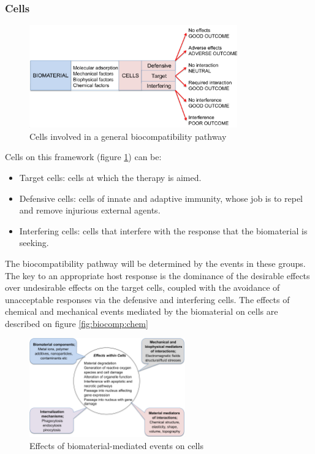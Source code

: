 		\subsubsection{Cells}

		\begin{figure}[ht]
			\includegraphics[width=0.8\textwidth]{biocomp_cells.png}
			\caption{Cells involved in a general biocompatibility pathway}
			\label{fig:biocomp_cells}
		\end{figure}

		Cells on this framework (figure \ref{fig:biocomp_cells}) can be:

		\begin{multicols}{2}
			\begin{itemize}
				\item Target cells: cells at which the therapy is aimed.
				\item Defensive cells: cells of innate and adaptive immunity, whose job is to repel and remove injurious external agents.
				\item Interfering cells: cells that interfere with the response that the biomaterial is seeking.
			\end{itemize}
		\end{multicols}

		The biocompatibility pathway will be determined by the events in these groups.
		The key to an appropriate host response is the dominance of the desirable effects over undesirable effects on the target cells, coupled with the avoidance of unacceptable responses via the defensive and interfering cells.
		The effects of chemical and mechanical events mediated by the biomaterial on cells are described on figure \ref{fig:biocomp:chem}


		\begin{figure}[ht]
			\includegraphics[width=0.6\textwidth]{biocomp_chem.png}
			\caption{Effects of biomaterial-mediated events on cells}
			\label{fig:biocomp_chem}
		\end{figure}

